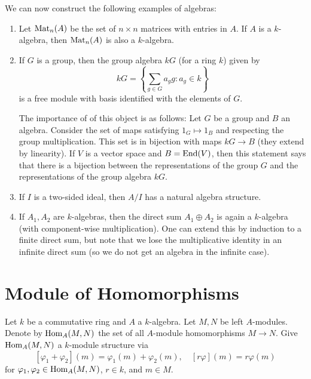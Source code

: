 \begin{example}
  We can now construct the following
  examples of algebras:
  \begin{enumerate}
    \item Let $\operatorname{Mat}_n(A)$ be the
      set of $n \times n$ matrices with
      entries in $A$. If $A$ is a
      $k$-algebra, then $\operatorname{Mat}_n(A)$
      is also a $k$-algebra.
    \item If $G$ is a group, then the
      group algebra $kG$ (for a ring $k$)
      given by
      \[
        kG = \left\{\sum_{g \in G} a_g g : a_g \in k\right\}
      \]
      is a free module with basis identified
      with the elements of $G$.

      The importance of of this
      object is as follows: Let $G$
      be a group and $B$ an algebra.
      Consider the set of maps satisfying
      $1_G \mapsto 1_B$ and respecting
      the group multiplication. This
      set is in bijection with maps
      $kG \to B$ (they extend by linearity).
      If $V$ is a vector space and
      $B = \operatorname{End}(V)$, then this statement
      says that there is a bijection
      between the representations of the
      group $G$
      and the representations of the group
      algebra $kG$.
    \item If $I$ is a two-sided ideal, then
      $A / I$ has a natural algebra
      structure.
    \item If $A_1, A_2$ are $k$-algebras,
      then the direct sum
      $A_1 \oplus A_2$ is again a
      $k$-algebra (with component-wise multiplication).
      One can extend this by induction to
      a finite direct sum, but note that
      we lose
      the multiplicative identity in
      an infinite direct sum (so we
      do not get an algebra in the infinite
      case).
  \end{enumerate}
\end{example}

\section{Module of Homomorphisms}
\begin{definition}
  Let $k$ be a commutative ring and
  $A$ a $k$-algebra. Let $M, N$ be
  left $A$-modules. Denote by
  $\operatorname{Hom}_A(M, N)$ the set of all
  $A$-module homomorphisms $M \to N$.
  Give $\operatorname{Hom}_A(M, N)$ a $k$-module
  structure via
  \[
    [\varphi_1 + \varphi_2](m) = \varphi_1(m) + \varphi_2(m), \quad
    [r \varphi](m) = r \varphi(m)
  \]
  for $\varphi_1, \varphi_2 \in \operatorname{Hom}_A(M, N)$,
  $r \in k$, and $m \in M$.
\end{definition}

